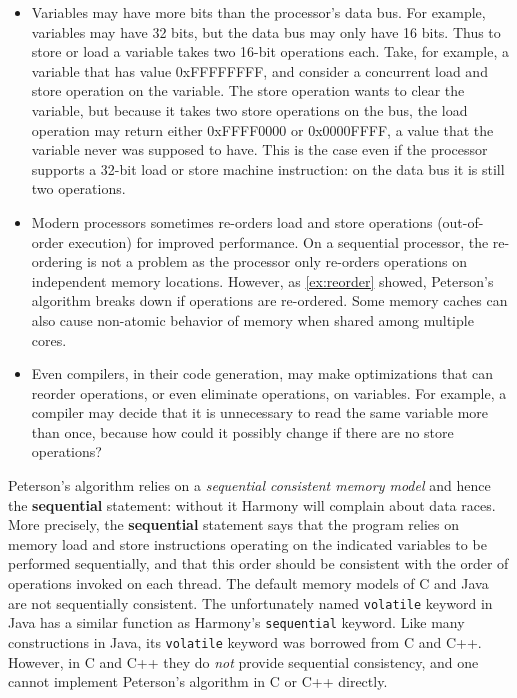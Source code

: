 \documentclass{report}
\begin{document}
\begin{itemize}
\item Variables may have more bits than the processor's data bus.
For example, variables may have 32 bits, but the data bus may only
have 16 bits.  Thus to store or load a variable takes two 16-bit
operations each.  Take, for example, a variable that has value
0xFFFFFFFF, and consider a concurrent load and store operation on
the variable.
The store operation wants to clear the variable, but because it
takes two store operations on the bus, the load operation may
return either 0xFFFF0000 or 0x0000FFFF, a value that the variable
never was supposed to have.
This is the case even if the processor supports a 32-bit load or
store machine instruction: on the data bus it is still two
operations.
\item Modern processors sometimes re-orders load and store operations
(out-of-order execution) for improved performance.  On a sequential processor,
the re-ordering is not a problem as the processor only re-orders
operations on independent memory locations.  However, as \autoref{ex:reorder}
showed, Peterson's algorithm breaks down if operations are re-ordered.
Some memory caches can also cause non-atomic behavior of memory when shared
among multiple cores.
\item Even compilers, in their code generation, may make optimizations
that can reorder operations, or even eliminate operations, on variables.
For example, a compiler may decide that it is unnecessary to read the same
variable more than once, because how could it possibly change if there
are no store operations?
\end{itemize}

Peterson's algorithm relies on a \emph{sequential consistent memory model}
and hence the \textbf{sequential} statement: without it Harmony will
complain about data races.
More precisely, the \textbf{sequential} statement says that the
program relies on memory load and store instructions operating on
the indicated variables to be performed sequentially, and that this
order should be consistent with the order of operations invoked on each
thread.
The default memory models of C and Java are not sequentially
consistent.
The unfortunately named \texttt{volatile} keyword in Java has
a similar function as Harmony's \texttt{sequential} keyword.
Like many constructions in Java, its \texttt{volatile} keyword
was borrowed from C and C++.
However, in C and C++ they do \emph{not} provide sequential
consistency, and one cannot implement Peterson's algorithm in
C or C++ directly.
\end{document}
